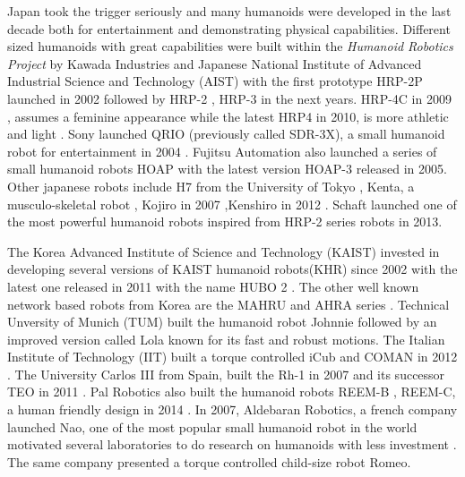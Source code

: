 Japan took the trigger seriously and many humanoids were developed in the last decade both for entertainment and demonstrating physical capabilities. Different sized humanoids with great capabilities were built within the \textit{Humanoid Robotics Project} by Kawada Industries and Japanese National Institute of Advanced Industrial Science and Technology (AIST)  with the first prototype HRP-2P launched in 2002 \cite{kaneko2002design} followed by HRP-2 \cite{Kaneko04humanoidrobot}, HRP-3 \cite{kaneko2008humanoid} in the next years. HRP-4C in 2009 \cite{kaneko2009cybernetic}, assumes a feminine appearance while the latest HRP4 in 2010, is more athletic and light \cite{kaneko2011humanoid}. Sony launched QRIO (previously called SDR-3X), a small humanoid robot for entertainment in 2004 \cite{geppert2004qrio}. Fujitsu Automation also launched a series of small humanoid robots HOAP with the latest version HOAP-3 released in 2005. Other japanese robots include H7  from the University of Tokyo \cite{nishiwaki2007experimental}, Kenta, a musculo-skeletal robot \cite{inaba2003building}, Kojiro in 2007 \cite{mizuuchi2007advanced},Kenshiro in 2012 \cite{nakanishi2012design}. Schaft launched one of the most powerful humanoid robots inspired from HRP-2 series robots in 2013.

The Korea Advanced Institute of Science and Technology (KAIST) invested in developing several versions of KAIST humanoid robots(KHR) since 2002 with the latest one released in 2011 with the name HUBO 2 \cite{kim2002development,park2005mechanical,park2005development,grey2013multi}. The other well known network based robots from Korea are the MAHRU and AHRA series \cite{you2005network,kwon2007biped, kim2011providing}. Technical Unversity of Munich (TUM) built the humanoid robot Johnnie \cite{gienger1999design} followed by an improved version called Lola \cite{lohmeier2009humanoid} known for its fast and robust motions. The Italian Institute of Technology (IIT)  built a torque controlled iCub \cite{metta2010icub} and COMAN in 2012
\cite{tsagarakis2013compliant}. The University Carlos III from Spain, built the Rh-1 in 2007 \cite{arbulu2007real} and its successor TEO in 2011 \cite{monje2011full}. Pal Robotics also built the humanoid robots REEM-B \cite{tellez2008reem}, REEM-C, a human friendly design in 2014 \cite{robotics2014reem}. In 2007, Aldebaran Robotics, a french company launched Nao, one of the most popular small humanoid robot in the world motivated several laboratories to do research on humanoids with less investment \cite{gouaillier2009mechatronic}. The same company presented a torque controlled child-size robot Romeo. 

